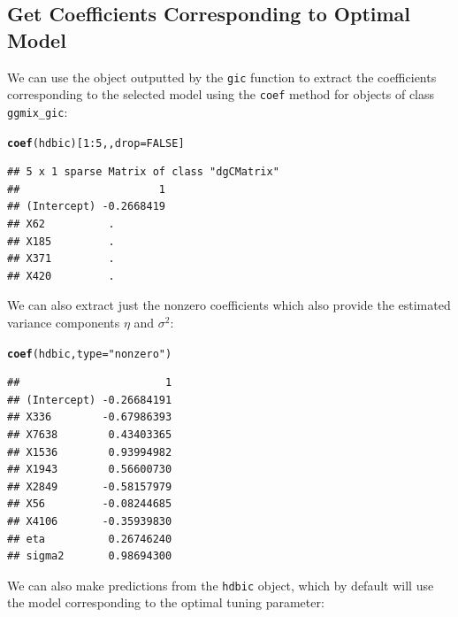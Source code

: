 \documentclass[12pt,letter]{article}\usepackage[]{graphicx}\usepackage[]{color}
\makeatletter
\newcommand{\hlnum}[1]{\textcolor[rgb]{0.686,0.059,0.569}{#1}}%
\newcommand{\hlstr}[1]{\textcolor[rgb]{0.192,0.494,0.8}{#1}}%
\newcommand{\hlopt}[1]{\textcolor[rgb]{0,0,0}{#1}}%
\newcommand{\hlstd}[1]{\textcolor[rgb]{0.345,0.345,0.345}{#1}}%
\newcommand{\hlkwc}[1]{\textcolor[rgb]{0.333,0.667,0.333}{#1}}%
\newcommand{\hlkwd}[1]{\textcolor[rgb]{0.737,0.353,0.396}{\textbf{#1}}}%
\newenvironment{kframe}{%
 \def\at@end@of@kframe{}%
 \ifinner\ifhmode%
  \def\at@end@of@kframe{\end{minipage}}%
  \begin{minipage}{\columnwidth}%
 \fi\fi%
 \def\FrameCommand##1{\hskip\@totalleftmargin \hskip-\fboxsep
 \colorbox{shadecolor}{##1}\hskip-\fboxsep
     \hskip-\linewidth \hskip-\@totalleftmargin \hskip\columnwidth}%
 \MakeFramed {\advance\hsize-\width
   \@totalleftmargin\z@ \linewidth\hsize
   \@setminipage}}%
 {\par\unskip\endMakeFramed%
 \at@end@of@kframe}
\newenvironment{knitrout}{}{} %
\makeatother
\begin{document}
\subsection{Get Coefficients Corresponding to Optimal Model}

We can use the object outputted by the \texttt{gic} function to extract the coefficients corresponding to the selected model using the \texttt{coef} method for objects of class \texttt{ggmix\_gic}:  

\begin{knitrout}\scriptsize
{}\color{fgcolor}\begin{kframe}
\begin{alltt}
\hlkwd{coef}\hlstd{(hdbic)[}\hlnum{1}\hlopt{:}\hlnum{5}\hlstd{, ,} \hlkwc{drop} \hlstd{=} \hlnum{FALSE}\hlstd{]}
\end{alltt}
\begin{verbatim}
## 5 x 1 sparse Matrix of class "dgCMatrix"
##                      1
## (Intercept) -0.2668419
## X62          .        
## X185         .        
## X371         .        
## X420         .
\end{verbatim}
\end{kframe}
\end{knitrout}

We can also extract just the nonzero coefficients which also provide the estimated variance components $\eta$ and $\sigma^2$:

\begin{knitrout}\scriptsize
{}\color{fgcolor}\begin{kframe}
\begin{alltt}
\hlkwd{coef}\hlstd{(hdbic,} \hlkwc{type} \hlstd{=} \hlstr{"nonzero"}\hlstd{)}
\end{alltt}
\begin{verbatim}
##                       1
## (Intercept) -0.26684191
## X336        -0.67986393
## X7638        0.43403365
## X1536        0.93994982
## X1943        0.56600730
## X2849       -0.58157979
## X56         -0.08244685
## X4106       -0.35939830
## eta          0.26746240
## sigma2       0.98694300
\end{verbatim}
\end{kframe}
\end{knitrout}

We can also make predictions from the \texttt{hdbic} object, which by default will use the model corresponding to the optimal tuning parameter:
\end{document}
